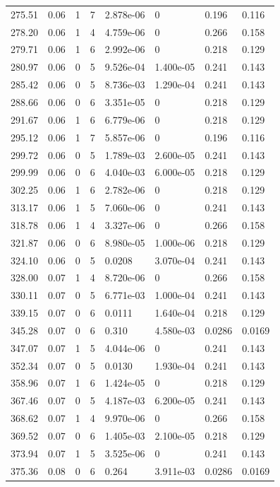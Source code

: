 \documentclass[preview]{standalone}
\begin{document}
{{{\begin{tabular}{L{1.2cm}C{1.2cm} C{0.3cm}C{0.5cm} C{1.4cm}C{1.4cm} C{1.4cm}C{1.4cm}}
  275.51  &  0.06  & 1     &  7 &  2.878e-06  & 0  & 0.196 &  0.116   \\ 
  278.20  &  0.06  & 1     &  4 &  4.759e-06  & 0  & 0.266 &  0.158   \\ 
  279.71  &  0.06  & 1     &  6 &  2.992e-06  & 0  & 0.218 &  0.129   \\ 
  280.97  &  0.06  & 0     &  5 &  9.526e-04  & 1.400e-05  & 0.241 &  0.143   \\ 
  285.42  &  0.06  & 0     &  5 &  8.736e-03  & 1.290e-04  & 0.241 &  0.143   \\ 
  288.66  &  0.06  & 0     &  6 &  3.351e-05  & 0  & 0.218 &  0.129   \\ 
  291.67  &  0.06  & 1     &  6 &  6.779e-06  & 0  & 0.218 &  0.129   \\ 
  295.12  &  0.06  & 1     &  7 &  5.857e-06  & 0  & 0.196 &  0.116   \\ 
  299.72  &  0.06  & 0     &  5 &  1.789e-03  & 2.600e-05  & 0.241 &  0.143   \\ 
  299.99  &  0.06  & 0     &  6 &  4.040e-03  & 6.000e-05  & 0.218 &  0.129   \\ 
  302.25  &  0.06  & 1     &  6 &  2.782e-06  & 0  & 0.218 &  0.129   \\ 
  313.17  &  0.06  & 1     &  5 &  7.060e-06  & 0  & 0.241 &  0.143   \\ 
  318.78  &  0.06  & 1     &  4 &  3.327e-06  & 0  & 0.266 &  0.158   \\ 
  321.87  &  0.06  & 0     &  6 &  8.980e-05  & 1.000e-06  & 0.218 &  0.129   \\ 
  324.10  &  0.06  & 0     &  5 &  0.0208  & 3.070e-04  & 0.241 &  0.143   \\ 
  328.00  &  0.07  & 1     &  4 &  8.720e-06  & 0  & 0.266 &  0.158   \\ 
  330.11  &  0.07  & 0     &  5 &  6.771e-03  & 1.000e-04  & 0.241 &  0.143   \\ 
  339.15  &  0.07  & 0     &  6 &  0.0111  & 1.640e-04  & 0.218 &  0.129   \\ 
  345.28  &  0.07  & 0     &  6 &  0.310  & 4.580e-03  & 0.0286 &  0.0169   \\ 
  347.07  &  0.07  & 1     &  5 &  4.044e-06  & 0  & 0.241 &  0.143   \\ 
  352.34  &  0.07  & 0     &  5 &  0.0130  & 1.930e-04  & 0.241 &  0.143   \\ 
  358.96  &  0.07  & 1     &  6 &  1.424e-05  & 0  & 0.218 &  0.129   \\ 
  367.46  &  0.07  & 0     &  5 &  4.187e-03  & 6.200e-05  & 0.241 &  0.143   \\ 
  368.62  &  0.07  & 1     &  4 &  9.970e-06  & 0  & 0.266 &  0.158   \\ 
  369.52  &  0.07  & 0     &  6 &  1.405e-03  & 2.100e-05  & 0.218 &  0.129   \\ 
  373.94  &  0.07  & 1     &  5 &  3.525e-06  & 0  & 0.241 &  0.143   \\ 
  375.36  &  0.08  & 0     &  6 &  0.264  & 3.911e-03  & 0.0286 &  0.0169   \\ 
\hline 
\end{tabular} 

}}}
\end{document}
